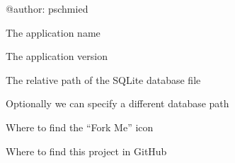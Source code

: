 \documentclass[letterpaper,10pt,english]{sphinxmanual}
\begin{document}
@author: pschmied

\begin{fulllineitems}
\label{\detokenize{src:src.Settings.APP_NAME}}
The application name

\end{fulllineitems}


\begin{fulllineitems}
\label{\detokenize{src:src.Settings.APP_VERSION}}
The application version

\end{fulllineitems}


\begin{fulllineitems}
\label{\detokenize{src:src.Settings.DB_NAME}}
The relative path of the SQLite database file

\end{fulllineitems}


\begin{fulllineitems}
\label{\detokenize{src:src.Settings.DB_PATH}}
Optionally we can specify a different database path

\end{fulllineitems}


\begin{fulllineitems}
\label{\detokenize{src:src.Settings.FORKME_PATH}}
Where to find the “Fork Me” icon

\end{fulllineitems}


\begin{fulllineitems}
\label{\detokenize{src:src.Settings.GITHUB_URL}}
Where to find this project in GitHub

\end{fulllineitems}
\end{document}

